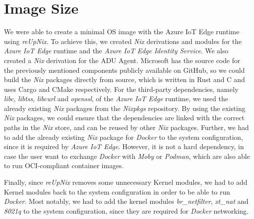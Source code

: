 
\section{Image Size}
We were able to create a minimal \ac{OS} image with the Azure IoT Edge runtime
using \textit{reUpNix}. To achieve this, we created \textit{Nix} derivations
and modules for the \textit{Azure IoT Edge} runtime and the \textit{Azure IoT Edge
Identity Service}. We also created a \textit{Nix} derivation for the \ac{ADU} Agent.
Microsoft has the source code for the previously mentioned components
publicly available on GitHub, so we could build the \textit{Nix} packages directly
from source, which is written in Rust and C and uses Cargo and CMake respectively.
For the third-party dependencies, namely \textit{libc}, \textit{libtss}, \textit{libcurl} and
\textit{openssl}, of the \textit{Azure IoT Edge} runtime, we used
the already existing \textit{Nix} packages from the \textit{Nixpkgs} repository.
By using the existing \textit{Nix} packages, we could ensure that the dependencies
are linked with the correct paths in the \textit{Nix} store, and can be reused
by other \textit{Nix} packages.
Further, we had to add the already existing \textit{Nix} package for \textit{Docker}
to the system configuration, since it is required by \textit{Azure IoT Edge}.
However, it is not a hard dependency, in case the user want to exchange \textit{Docker}
with \textit{Moby} or \textit{Podman}, which are also able to run \ac{OCI}-compliant
container images.

Finally, since \textit{reUpNix} removes some unnecessary
Kernel modules, we had to add Kernel modules back to the system configuration in order
to be able to run \textit{Docker}.
Most notably, we had to add the kernel modules
\textit{br\_netfilter}, \textit{xt\_nat} and \textit{8021q} to the system configuration,
since they are required for \textit{Docker} networking.

